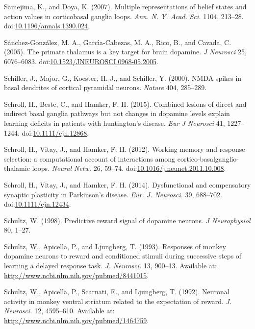 \documentclass[
  11pt,
  a4paper,
]{scrbook}
\newlength{\cslhangindent}
\newenvironment{CSLReferences}[2] %
 {\begin{list}{}{%
  \setlength{\itemindent}{0pt}
  \setlength{\leftmargin}{0pt}
  \setlength{\parsep}{0pt}
  \ifodd #1
   \setlength{\leftmargin}{\cslhangindent}
   \setlength{\itemindent}{-1\cslhangindent}
  \fi
  \setlength{\itemsep}{#2\baselineskip}}}
 {\end{list}}
\begin{document}
\begin{CSLReferences}{1}{1}
Samejima, K., and Doya, K. (2007). {Multiple representations of belief
states and action values in corticobasal ganglia loops.} \emph{Ann. N.
Y. Acad. Sci.} 1104, 213--28.
doi:\href{https://doi.org/10.1196/annals.1390.024}{10.1196/annals.1390.024}.

Sánchez-González, M. A., Garcı́a-Cabezas, M. A., Rico, B., and Cavada, C.
(2005). The primate thalamus is a key target for brain dopamine. \emph{J
Neurosci} 25, 6076--6083.
doi:\href{https://doi.org/10.1523/JNEUROSCI.0968-05.2005}{10.1523/JNEUROSCI.0968-05.2005}.

Schiller, J., Major, G., Koester, H. J., and Schiller, Y. (2000). {NMDA}
spikes in basal dendrites of cortical pyramidal neurons. \emph{Nature}
404, 285--289.

Schroll, H., Beste, C., and Hamker, F. H. (2015). Combined lesions of
direct and indirect basal ganglia pathways but not changes in dopamine
levels explain learning deficits in patients with huntington's disease.
\emph{Eur J Neurosci} 41, 1227--1244.
doi:\href{https://doi.org/10.1111/ejn.12868}{10.1111/ejn.12868}.

Schroll, H., Vitay, J., and Hamker, F. H. (2012). {Working memory and
response selection: a computational account of interactions among
cortico-basalganglio-thalamic loops.} \emph{Neural Netw.} 26, 59--74.
doi:\href{https://doi.org/10.1016/j.neunet.2011.10.008}{10.1016/j.neunet.2011.10.008}.

Schroll, H., Vitay, J., and Hamker, F. H. (2014). {Dysfunctional and
compensatory synaptic plasticity in Parkinson's disease.} \emph{Eur. J.
Neurosci.} 39, 688--702.
doi:\href{https://doi.org/10.1111/ejn.12434}{10.1111/ejn.12434}.

Schultz, W. (1998). Predictive reward signal of dopamine neurons.
\emph{J Neurophysiol} 80, 1--27.

Schultz, W., Apicella, P., and Ljungberg, T. (1993). {Responses of
monkey dopamine neurons to reward and conditioned stimuli during
successive steps of learning a delayed response task.} \emph{J.
Neurosci.} 13, 900--13. Available at:
\url{http://www.ncbi.nlm.nih.gov/pubmed/8441015}.

Schultz, W., Apicella, P., Scarnati, E., and Ljungberg, T. (1992).
{Neuronal activity in monkey ventral striatum related to the expectation
of reward.} \emph{J. Neurosci.} 12, 4595--610. Available at:
\url{http://www.ncbi.nlm.nih.gov/pubmed/1464759}.


\end{CSLReferences}
\end{document}
